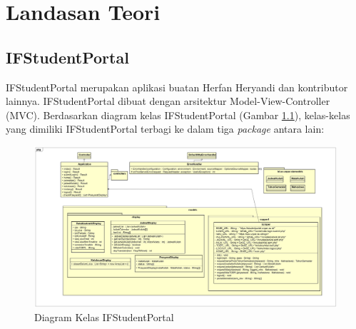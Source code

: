 \chapter{Landasan Teori}
\label{chap:teori}

\section{IFStudentPortal}
\label{sec:ifstudentportal} 
 
IFStudentPortal \cite{ifstudentportal} merupakan aplikasi buatan Herfan Heryandi dan kontributor lainnya. IFStudentPortal dibuat dengan arsitektur Model-View-Controller (MVC). Berdasarkan diagram kelas IFStudentPortal (Gambar \ref{fig:2_ifstudentportal_class}), kelas-kelas yang dimiliki IFStudentPortal terbagi ke dalam tiga \textit{package} antara lain:

\begin{figure}[H]
\centering
\includegraphics[scale=0.35]{Gambar/class-diagram-ifstudentportal}
\caption{Diagram Kelas IFStudentPortal}
\label{fig:2_ifstudentportal_class}
\end{figure}

